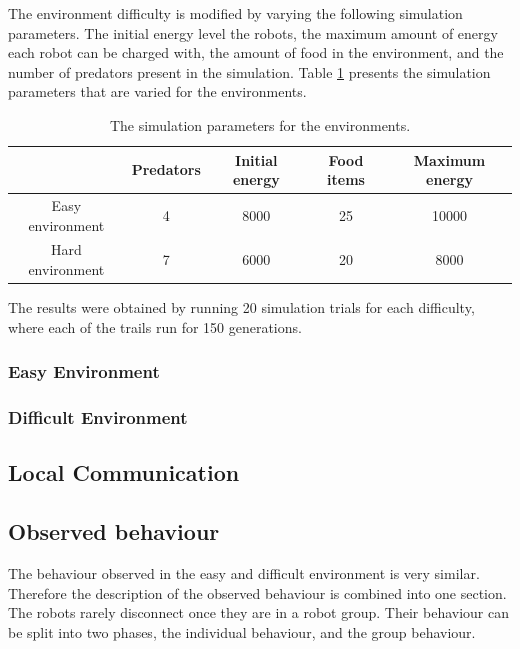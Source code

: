 The environment difficulty is modified by varying the following simulation parameters.
The initial energy level the robots, the maximum amount of energy each robot can be charged with, the amount of food in the environment, and the number of predators present in the simulation.
Table \ref{tab:environment-difficulty} presents the simulation parameters that are varied for the environments.

\begin{table}[H]
	\centering
	\label{tab:environment-difficulty}
	\begin{tabular}{|c|c|c|c|c|}
		\hline  & Predators & Initial energy & Food items & Maximum energy \\ 
		\hline Easy environment & 4 & 8000 & 25 & 10000 \\ 
		\hline Hard environment & 7 & 6000 & 20 &8000 \\ 
		\hline 
		
	\end{tabular} 
	\caption{The simulation parameters for the environments.}
\end{table}

The results were obtained by running 20 simulation trials for each difficulty, where each of the trails run for 150 generations.
\subsubsection{Easy Environment}

\newpage
\pagestyle{plain}





 
\newpage





\subsubsection{Difficult Environment}

\newpage



\newpage
\pagestyle{main}

\subsection{Local Communication}


\subsection{Observed behaviour}
\label{sec:observed-behaviour}
The behaviour observed in the easy and difficult environment is very similar.
Therefore the description of the observed behaviour is combined into one section.
The robots rarely disconnect once they are in a robot group.
Their behaviour can be split into two phases, the individual behaviour, and the group behaviour.

